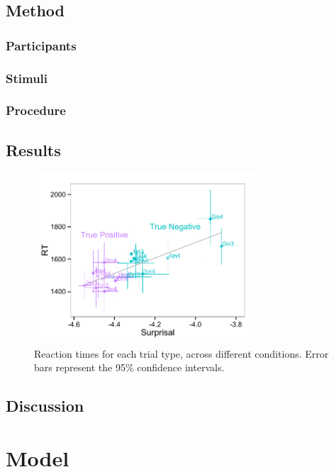 \documentclass[10pt,letterpaper]{article}
\begin{document}
\subsection{Method}

\subsubsection{Participants}

\subsubsection{Stimuli}

\subsubsection{Procedure}

\subsection{Results}
\begin{figure}
\begin{center} 
\includegraphics[width=3.25in]{figures/speakerstudy_comparison.pdf}
\caption{\label{fig:addition_subs} Reaction times for each trial type, across different conditions.  Error bars represent the 95\% confidence intervals.}
\end{center} 
\end{figure}

\subsection{Discussion}

\section{Model}
\end{document}
